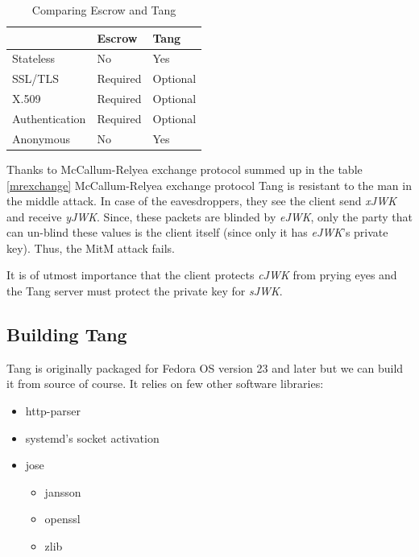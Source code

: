 \begin{table}[h]
\centering
\label{compare}
\begin{tabular}{@{}lll@{}}
\toprule
               & Escrow   & Tang                         \\ \midrule
Stateless      & No       & Yes                          \\
SSL/TLS        & Required & Optional                     \\
X.509          & Required & Optional                     \\
Authentication & Required & Optional                     \\
Anonymous      & No       & Yes                          \\ \bottomrule
\end{tabular}
\caption{Comparing Escrow and Tang}
\end{table}

Thanks to McCallum-Relyea exchange protocol summed up in the table \ref{mrexchange} McCallum-Relyea exchange protocol Tang is resistant to the man in the middle attack.
In case of the eavesdroppers, they see the client send {\it xJWK} and receive {\it yJWK}.
Since, these packets are blinded by {\it eJWK}, only the party that can un-blind these values is the client itself (since only it has {\it eJWK}'s private key).
Thus, the MitM attack fails.

It is of utmost importance that the client protects {\it cJWK} from prying eyes and the Tang server must protect the private key for {\it sJWK}.



\subsection{Building Tang}

Tang is originally packaged for Fedora OS version 23 and later but we can build it from source of course.
It relies on few other software libraries:
\label{dependencies}
\begin{itemize}
\item http-parser
\item systemd's socket activation
\item jose
    \begin{itemize}
    \item jansson
    \item openssl
    \item zlib
    \end{itemize}
\end{itemize}

